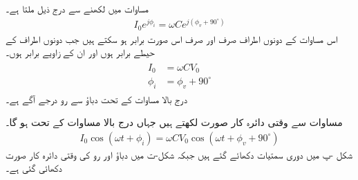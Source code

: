 مساوات  میں  لکھنے سے درج ذیل ملتا ہے۔
\begin{align}\label{مساوات_بدلتا_برق_گیر_دوری_مساوات_ب}
I_0 e^{j\phi_i}= \omega C e^{j (\phi_v+90^{\circ})}
\end{align}
اس مساوات کے دونوں اطراف صرف اور صرف اس صورت برابر ہو سکتے ہیں جب دونوں اطراف کے حیطے برابر ہوں اور ان کے زاویے برابر ہوں۔
\begin{gather}
\begin{aligned}
I_0&=\omega C V_0\\
\phi_i&=\phi_v+90^{\circ}
\end{aligned}
\end{gather}
درج بالا مساوات کے تحت دباؤ سے رو  درجے آگے ہے۔

مساوات  سے وقتی دائرہ کار صورت لکھتے ہیں جہاں درج بالا مساوات کے تحت  ہو گا۔
\begin{align}
I_0 \cos (\omega t +\phi_i)=\omega C V_0 \cos(\omega t +\phi_v+90^{\circ})
\end{align}
شکل -پ میں دوری سمتیات دکھائے گئے ہیں جبکہ شکل-ت میں دباؤ اور رو کی وقتی دائرہ کار صورت دکھائی گئی ہے۔

